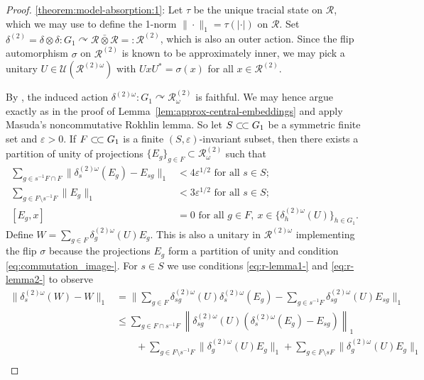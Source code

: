 \documentclass[11pt,a4paper]{article}
\theoremstyle{definition}
\theoremstyle{remark}
\numberwithin{equation}{section}
\numberwithin{theorem}{section}
\newcommand{\e}{\varepsilon}
\newcommand{\ssubset}{\subset\joinrel\subset}
\begin{document}
\begin{proof}
\ref{theorem:model-absorption:1}:
Let $\tau$ be the unique tracial state on $\mathcal R$, which we may use to define the 1-norm $\|\cdot\|_1=\tau(|\cdot|)$ on $\mathcal R$.
Set $\delta^{(2)}=\delta\otimes\delta: G_1\curvearrowright \mathcal R\bar{\otimes}\mathcal R=:\mathcal R^{(2)}$, which is also an outer action.
Since the flip automorphism $\sigma$ on $\mathcal R^{(2)}$ is known to be approximately inner, we may pick a unitary $U\in\mathcal{U}(\mathcal R^{(2)\omega})$ with $UxU^*=\sigma(x)$ for all $x\in\mathcal R^{(2)}$.

By \cite[Theorem 3.2]{Connes77}, the induced action $\delta^{(2)\omega}: G_1\curvearrowright\mathcal R^{(2)}_\omega$ is faithful.
We may hence argue exactly as in the proof of Lemma~\ref{lem:approx-central-embeddings} and apply Masuda's noncommutative Rokhlin lemma.
So let $S\ssubset G_1$ be a symmetric finite set and $\e>0$.
If $F \ssubset G_1$ is a finite $(S,\e)$-invariant subset, then there exists a partition of unity of projections $\{E_g\}_{g \in F} \subset \mathcal R^{(2)}_\omega$ such that
\begin{align}
\sum_{g \in s^{-1}F \cap F} \|\delta^{(2)\omega}_{s}(E_g) - E_{sg}\|_1 &< 4\e^{1/2} \text{ for all } s \in S; \label{eq:r-lemma1-}\\
\sum_{g \in F\setminus s^{-1}F} \|E_g\|_1 &< 3\e^{1/2} \text{ for all } s \in S;\label{eq:r-lemma2-}\\
[E_g, x] &= 0 \text{ for all } g \in F,\ x\in\{ \delta^{(2)\omega}_h(U)\}_{h\in G_1}.\label{eq:commutation_image-}
\end{align}
Define $W = \sum_{g \in F} \delta^{(2)\omega}_{g}(U) E_g$.
This is also a unitary in $\mathcal R^{(2)\omega}$ implementing the flip $\sigma$ because the projections $E_g$ form a partition of unity and condition \eqref{eq:commutation_image-}.
For $s \in S$ we use conditions \eqref{eq:r-lemma1-} and \eqref{eq:r-lemma2-} to observe
\begin{align*}
\|\delta^{(2)\omega}_{s}(W) - W\|_1 &=  \Big\| \sum_{g \in F} \delta^{(2)\omega}_{sg}(U) \delta^{(2)\omega}_{s}(E_g) - \sum_{g \in s^{-1}F} \delta^{(2)\omega}_{sg}(U) E_{sg} \Big\|_1
\\
&\leq \sum_{g \in F \cap s^{-1}F}  \left\| \delta^{(2)\omega}_{sg}(U) ( \delta^{(2)\omega}_{s}(E_g) - E_{sg}) \right\|_1\\ & \qquad + \sum_{g \in F\setminus s^{-1}F} \| \delta^{(2)\omega}_{g}(U) E_g\|_1 + \sum_{g \in F \setminus sF} \|\delta^{(2)\omega}_{g}(U) E_{g}\|_1 \\

\end{align*}
\end{proof}
\end{document}

